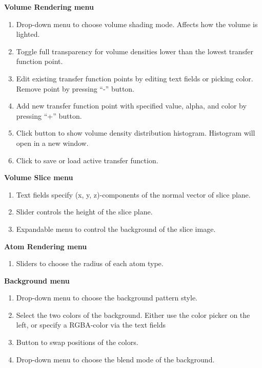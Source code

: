 \textbf{Volume Rendering menu}
\begin{enumerate}[label={(\arabic*)}]
  \item Drop-down menu to choose volume shading mode. Affects how the volume is lighted.
  \item Toggle full transparency for volume densities lower than the lowest transfer function point.
  \item Edit existing transfer function points by editing text fields or picking color. Remove point by pressing ``-'' button.
  \item Add new transfer function point with specified value, alpha, and color by pressing ``+'' button.
  \item Click button to show volume density distribution histogram. Histogram will open in a new window.
  \item Click to save or load active transfer function. 
\end{enumerate}

\textbf{Volume Slice menu}
\begin{enumerate}[label={(\arabic*)}]
  \item Text fields specify (x, y, z)-components of the normal vector of slice plane.
  \item Slider controls the height of the slice plane.
  \item Expandable menu to control the background of the slice image.
\end{enumerate}

\textbf{Atom Rendering menu}
\begin{enumerate}[label={(\arabic*)}]
  \item Sliders to choose the radius of each atom type.
\end{enumerate}

\textbf{Background menu}
\begin{enumerate}[label={(\arabic*)}]
  \item Drop-down menu to choose the background pattern style.
  \item Select the two colors of the background. Either use the color picker on the left, or specify a RGBA-color via the text fields
  \item Button to swap positions of the colors.
  \item Drop-down menu to choose the blend mode of the background.
\end{enumerate}

